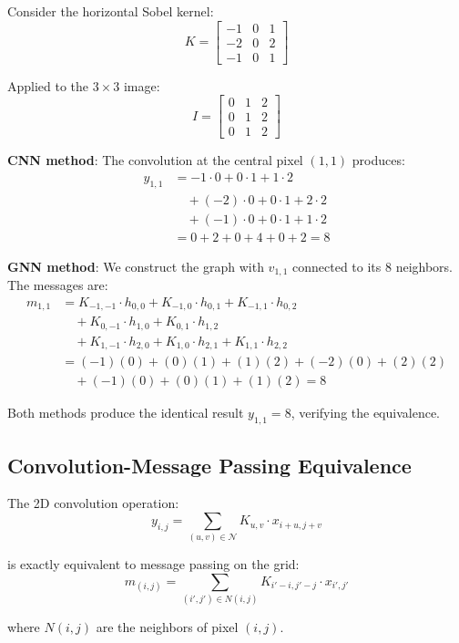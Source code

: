 \begin{example}\label{ex:verificacion_numerica_sobel}
Consider the horizontal Sobel kernel:
\[
K = \begin{bmatrix} -1 & 0 & 1 \\ -2 & 0 & 2 \\ -1 & 0 & 1 \end{bmatrix}
\]

Applied to the $3 \times 3$ image:
\[
I = \begin{bmatrix} 0 & 1 & 2 \\ 0 & 1 & 2 \\ 0 & 1 & 2 \end{bmatrix}
\]

\textbf{CNN method}: The convolution at the central pixel $(1,1)$ produces:
\begin{align}
y_{1,1} &= -1 \cdot 0 + 0 \cdot 1 + 1 \cdot 2 \\
        &\quad + (-2) \cdot 0 + 0 \cdot 1 + 2 \cdot 2 \\
        &\quad + (-1) \cdot 0 + 0 \cdot 1 + 1 \cdot 2 \\
        &= 0 + 2 + 0 + 4 + 0 + 2 = 8
\end{align}

\textbf{GNN method}: We construct the graph with $v_{1,1}$ connected to its 8 neighbors. The messages are:
\begin{align}
m_{1,1} &= K_{-1,-1} \cdot h_{0,0} + K_{-1,0} \cdot h_{0,1} + K_{-1,1} \cdot h_{0,2} \\
        &\quad + K_{0,-1} \cdot h_{1,0} + K_{0,1} \cdot h_{1,2} \\
        &\quad + K_{1,-1} \cdot h_{2,0} + K_{1,0} \cdot h_{2,1} + K_{1,1} \cdot h_{2,2} \\
        &= (-1)(0) + (0)(1) + (1)(2) + (-2)(0) + (2)(2) \\
        &\quad + (-1)(0) + (0)(1) + (1)(2) = 8
\end{align}

Both methods produce the identical result $y_{1,1} = 8$, verifying the equivalence.
\end{example}

\subsection{Convolution-Message Passing Equivalence}\label{subsec:equivalencia_conv_mp}

\begin{theorem}\label{thm:equivalencia_fundamental_conv_mp}
The 2D convolution operation:
\[
y_{i,j} = \sum_{(u,v) \in \mathcal{N}} K_{u,v} \cdot x_{i+u,j+v}
\]

is exactly equivalent to message passing on the grid:
\[
m_{(i,j)} = \sum_{(i',j') \in N(i,j)} K_{i'-i,j'-j} \cdot x_{i',j'}
\]

where \(N(i,j)\) are the neighbors of pixel \((i,j)\).
\end{theorem}

